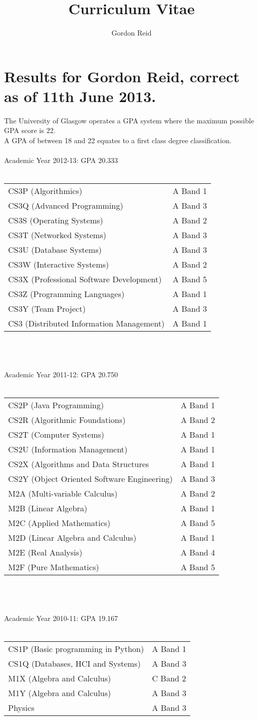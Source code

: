 \documentclass[10pt,a4paper]{article}
\title{Curriculum Vitae}
\author{Gordon Reid}
\begin{document}
\section*{Results for Gordon Reid, correct as of 11th June 2013.}
The University of Glasgow operates a GPA system where the maximum possible
GPA score is 22.\\
A GPA of between 18 and 22 equates to a first class degree classification.\\\\
Academic Year 2012-13: GPA 20.333\\\\
\begin{tabular}{p{10cm}l}
	CS3P (Algorithmics) & A Band 1\\
	CS3Q (Advanced Programming) & A Band 3\\
	CS3S (Operating Systems) & A Band 2\\
	CS3T (Networked Systems) & A Band 3\\
	CS3U (Database Systems) & A Band 3\\
	CS3W (Interactive Systems) & A Band 2\\
	CS3X (Professional Software Development) & A Band 5\\
	CS3Z (Programming Languages) & A Band 1\\
	CS3Y (Team Project) & A Band 3\\
	CS3 (Distributed Information Management) & A Band 1\\
\end{tabular}
\\\\\\
Academic Year 2011-12: GPA 20.750\\\\
\begin{tabular}{p{10cm}l}
	CS2P (Java Programming) & A Band 1\\
	CS2R (Algorithmic Foundations) & A Band 2\\
	CS2T (Computer Systems) & A Band 1\\
	CS2U (Information Management) & A Band 1\\
	CS2X (Algorithms and Data Structures & A Band 1\\
	CS2Y (Object Oriented Software Engineering) & A Band 3\\
	M2A (Multi-variable Calculus) & A Band 2\\
	M2B (Linear Algebra) & A Band 1\\
	M2C (Applied Mathematics) & A Band 5\\
	M2D (Linear Algebra and Calculus) & A Band 1\\
	M2E (Real Analysis) & A Band 4\\
	M2F (Pure Mathematics) & A Band 5\\
\end{tabular}
\\\\\\
Academic Year 2010-11: GPA 19.167\\\\
\begin{tabular}{p{10cm}l}
	CS1P (Basic programming in Python) & A Band 1\\
	CS1Q (Databases, HCI and Systems) & A Band 3\\
	M1X (Algebra and Calculus) & C Band 2\\
	M1Y (Algebra and Calculus) & A Band 3\\
	Physics & A Band 3\\
\end{tabular}
\end{document}
